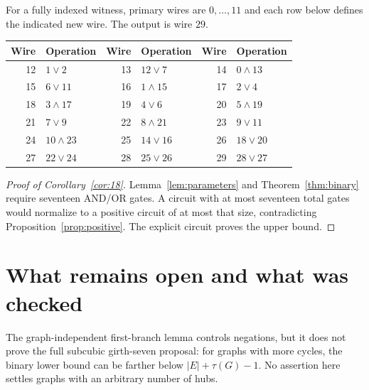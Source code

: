 \documentclass[11pt]{article}
\newcommand{\AND}{\mathbin{\wedge}}
\newcommand{\OR}{\mathbin{\vee}}
\theoremstyle{definition}
\theoremstyle{remark}
\begin{document}
For a fully indexed witness, primary wires are $0,\ldots,11$ and each row
below defines the indicated new wire. The output is wire $29$.
\begin{center}
\begin{tabular}{rl@{\qquad}rl@{\qquad}rl}
\toprule
Wire&Operation&Wire&Operation&Wire&Operation\\
\midrule
12&$1\OR2$&13&$12\OR7$&14&$0\AND13$\\
15&$6\OR11$&16&$1\AND15$&17&$2\OR4$\\
18&$3\AND17$&19&$4\OR6$&20&$5\AND19$\\
21&$7\OR9$&22&$8\AND21$&23&$9\OR11$\\
24&$10\AND23$&25&$14\OR16$&26&$18\OR20$\\
27&$22\OR24$&28&$25\OR26$&29&$28\OR27$\\
\bottomrule
\end{tabular}
\end{center}

\begin{proof}[Proof of Corollary~\ref{cor:18}]
Lemma~\ref{lem:parameters} and Theorem~\ref{thm:binary} require seventeen
AND/OR gates. A circuit with at most seventeen total gates would normalize
to a positive circuit of at most that size, contradicting
Proposition~\ref{prop:positive}. The explicit circuit proves the upper
bound.
\end{proof}




\section{What remains open and what was checked}

The graph-independent first-branch lemma controls negations, but it does
not prove the full subcubic girth-seven proposal: for graphs with more
cycles, the binary lower bound can be farther below $|E|+\tau(G)-1$.
No assertion here settles graphs with an arbitrary number of hubs.
\end{document}
